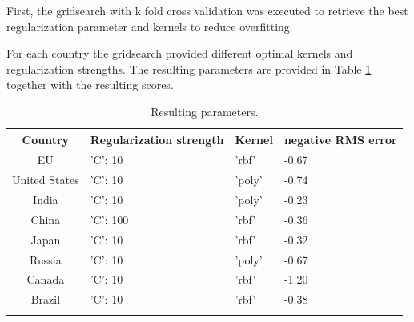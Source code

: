First, the gridsearch with k fold cross validation was executed to retrieve the best regularization parameter and kernels to reduce overfitting.

For each country the gridsearch provided different optimal kernels and regularization strengths. The resulting parameters are provided in Table \ref{buildings:kernel} together with the resulting scores.

\begin{table}[h!]
	\centering
	\begin{tabular}{clll}
		\hline
		Country & Regularization strength & Kernel & negative RMS error \\
		\hline
		\hline 
		EU & 'C': 10 & 'rbf' &
		-0.67 \\
		United States & 'C': 10 & 'poly' & 
		-0.74 \\
		India &'C': 10 & 'poly' &
		-0.23 \\
		China &'C': 100 &  'rbf' &
		-0.36 \\
		Japan &  'C': 10 & 'rbf' &
		-0.32 \\
		Russia &'C': 10 & 'poly' &
		-0.67 \\
		Canada &'C': 10 & 'rbf' &
		-1.20 \\
		Brazil &'C': 10 & 'rbf' &
		-0.38 \\
		\hline 
		&&& \\
	\end{tabular}
	\caption{Resulting parameters.}
	\label{buildings:kernel}  
\end{table}



